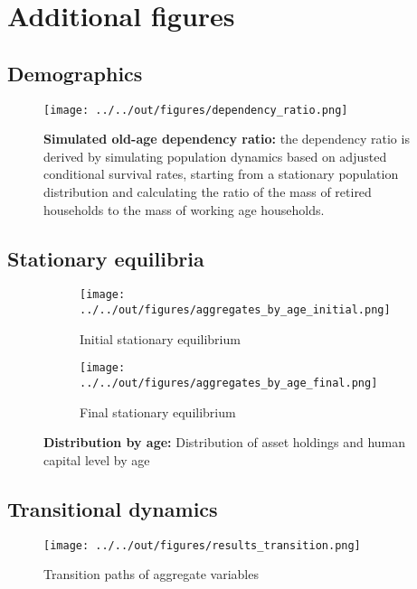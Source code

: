 \section{Additional figures}
\label{sec:figures}

\subsection{Demographics}

\begin{figure}[H]
    \label{fig:dependency_ratio}
    \texttt{[image: ../../out/figures/dependency\_ratio.png]}
    \caption{\textbf{Simulated old-age dependency ratio:} the dependency ratio is derived by simulating population dynamics based on adjusted conditional survival rates, starting from a stationary population distribution and calculating the ratio of the mass of retired households to the mass of working age households.}
\end{figure}

\subsection{Stationary equilibria}

\begin{figure}[H]
    \centering
    \begin{subfigure}[b]{0.45\textwidth}
        \centering
        \texttt{[image: ../../out/figures/aggregates\_by\_age\_initial.png]}
        \caption{Initial stationary equilibrium}
        \label{fig:aggregates_by_age_initial}
    \end{subfigure}
    \hfill
    \begin{subfigure}[b]{0.45\textwidth}
        \centering
        \texttt{[image: ../../out/figures/aggregates\_by\_age\_final.png]}
        \caption{Final stationary equilibrium}
        \label{fig:aggregates_by_age_final}
    \end{subfigure}
    \caption{\textbf{Distribution by age:} Distribution of asset holdings and human capital level by age}
    \label{fig:aggregates_by_age}
\end{figure}

\subsection{Transitional dynamics}

\begin{figure}[H]
    \texttt{[image: ../../out/figures/results\_transition.png]}
    \caption{Transition paths of aggregate variables}
    \label{fig:transition_aggregates}
\end{figure}
